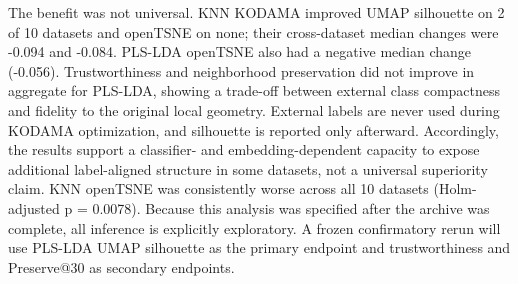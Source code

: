 \documentclass[twoside,11pt]{article}
\begin{document}
\begin{small}
The benefit was not universal. KNN KODAMA improved UMAP silhouette on 2 of 10 datasets and openTSNE on none; their cross-dataset median changes were -0.094 and -0.084. PLS-LDA openTSNE also had a negative median change (-0.056). Trustworthiness and neighborhood preservation did not improve in aggregate for PLS-LDA, showing a trade-off between external class compactness and fidelity to the original local geometry. External labels are never used during KODAMA optimization, and silhouette is reported only afterward. Accordingly, the results support a classifier- and embedding-dependent capacity to expose additional label-aligned structure in some datasets, not a universal superiority claim. KNN openTSNE was consistently worse across all 10 datasets (Holm-adjusted p = 0.0078). Because this analysis was specified after the archive was complete, all inference is explicitly exploratory. A frozen confirmatory rerun will use PLS-LDA UMAP silhouette as the primary endpoint and trustworthiness and Preserve@30 as secondary endpoints.


\end{small}
\end{document}
